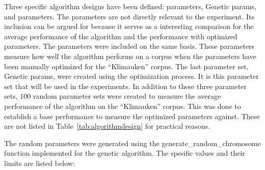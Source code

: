 Three specific algorithm designs have been defined: \citeauthor{Oren1998} parameters, Genetic params, and \citeauthor{Moe2013} parameters. The \citeauthor{Oren1998} parameters are not directly relevant to the experiment. Its inclusion can be argued for because it serves as a interesting comparison for the average performance of the algorithm and the performance with optimized parameters. The \citeauthor{Moe2013} parameters were included on the same basis. These parameters measure how well the algorithm performs on a corpus when the parameters have been manually optimized for the ``Klimauken'' corpus. The last parameter set, Genetic params, were created using the \GA optimization process. It is this parameter set that will be used in the experiments. In addition to these three parameter sets, 100 random parameter sets were created to measure the average performance of the \CTC algorithm on the ``Klimauken'' corpus. This was done to establish a base performance to measure the optimized parameters against. These are not listed in Table~\ref{tab:algorithmdesign} for practical reasons.

The random parameters were generated using the generate\_random\_chromosome function implemented for the genetic algorithm. The spesific values and their limits are listed below:

